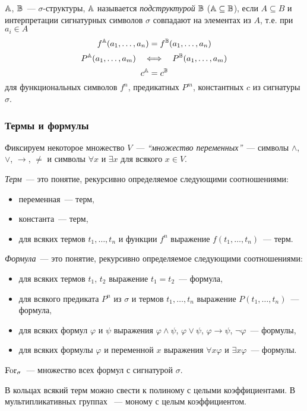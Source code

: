 \begin{definition}
	${\mathbb A}$, ${\mathbb B}$~— $\sigma$-структуры, ${\mathbb A}$ называется \emph{подструктурой} ${\mathbb B}$ (${\mathbb A} \subseteq {\mathbb B}$), если $A \subseteq B$ и интерпретации сигнатурных символов $\sigma$ совпадают на элементах из $A$, т.е. при $a_i\in A$
	\[f^{\mathbb A}(a_1, \dots, a_n) = f^{\mathbb B}(a_1, \dots, a_n)\]
	\[P^{\mathbb A}(a_1, \dots, a_m) \quad \Longleftrightarrow \quad P^{\mathbb B}(a_1, \dots, a_m)\]
	\[c^{\mathbb A} = c^{\mathbb B}\]
	для функциональных символов $f^n$, предикатных $P^m$, константных $c$ из сигнатуры $\sigma$.
\end{definition}

\subsubsection{Термы и формулы}

\begin{definition}
	Фиксируем некоторое множество $V$~— \emph{“множество переменных”}~— символы $\wedge$, $\vee$, $\to$, $\neq$ и символы $\forall x$ и $\exists x$ для всякого $x \in V$.
	
	\emph{Терм}~— это понятие, рекурсивно определяемое следующими соотношениями:
	\begin{itemize}
		\item переменная~— терм,
		\item константа~— терм,
		\item для всяких термов $t_1, \dots, t_n$ и функции $f^n$ выражение $f(t_1, \dots, t_n)$~— терм.
	\end{itemize}

	\emph{Формула}~— это понятие, рекурсивно определяемое следующими соотношениями:
	\begin{itemize}
		\item для всяких термов $t_1$, $t_2$ выражение $t_1 = t_2$~— формула,
		\item для всякого предиката $P^n$ из $\sigma$ и термов $t_1, \dots, t_n$ выражение $P(t_1, \dots, t_n)$~— формула,
		\item для всяких формул $\varphi$ и $\psi$ выражения $\varphi \wedge \psi$, $\varphi \vee \psi$, $\varphi \to \psi$, $\neg \varphi$~— формулы,
		\item для всяких формулы $\varphi$ и переменной $x$ выражения $\forall x \varphi$ и $\exists x \varphi$~— формулы.
	\end{itemize}
	$\operatorname{For}_\sigma$~— множество всех формул с сигнатурой $\sigma$.
\end{definition}

\begin{exmpl}
	В кольцах всякий терм можно свести к полиному с целыми коэффициентами. В мультипликативных группах ~— моному с целым коэффициентом.
\end{exmpl}

